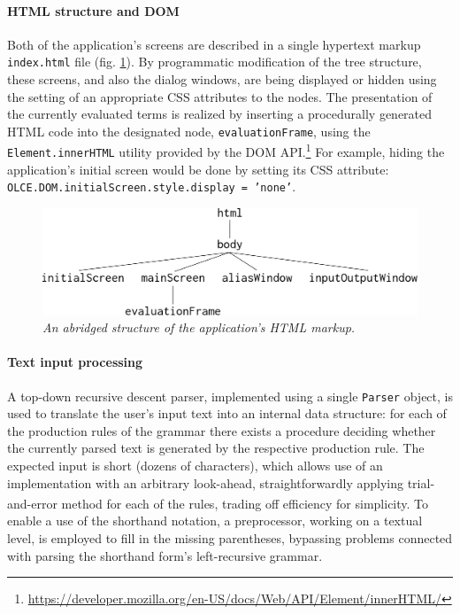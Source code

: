 \documentclass[table, a4paper, 10pt]{article}
\newcommand{\cit}[1]{\textsuperscript{\cite{#1}}}
\begin{document}
\paragraph{HTML structure and DOM}
Both of the application's screens are described in a single hypertext markup \texttt{index.html} file (fig. \ref{html}).
By programmatic modification of the tree structure,
these screens, and also the dialog windows, are being
displayed or hidden using the setting of an appropriate CSS attributes to
the nodes. The presentation of the currently evaluated terms is realized
by inserting a procedurally generated HTML code into
the designated node, \texttt{evaluationFrame}, using the \texttt{Element.innerHTML} utility provided by the
DOM API.\footnote{\url{https://developer.mozilla.org/en-US/docs/Web/API/Element/innerHTML/}}
For example, hiding the application's initial screen would be done 
by setting its CSS attribute:
\texttt{OLCE.DOM.initialScreen.style.display = 'none'}.

\begin{figure}[H]\centering
\includegraphics[scale=0.35]{htmlstructure.pdf}
\caption{\textit{An abridged structure of the application's HTML markup.}}\label{html}
\end{figure}

\paragraph{Text input processing}
A top-down recursive descent parser, implemented using a single \texttt{Parser} object,
is used to translate the user's input text into an
internal data structure: for each of the production rules of the grammar there exists
a procedure deciding whether the currently parsed text is generated by the respective production rule.
The expected input is short (dozens of characters), which allows use of an implementation with an arbitrary
look-ahead, straightforwardly applying trial-and-error method for each of the rules,
trading off efficiency for simplicity.\cit{compilers} To enable a use of
the shorthand notation, a preprocessor, working on a textual level, is
employed to fill in the missing parentheses, bypassing problems connected
with parsing the shorthand form's left-recursive grammar.
\end{document}
